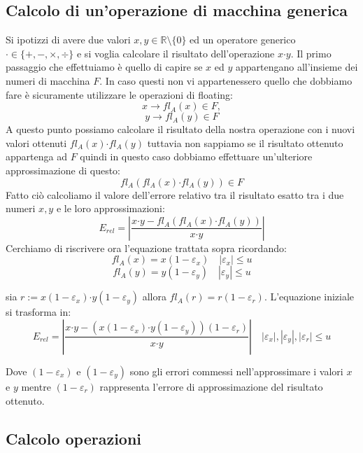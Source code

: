 \documentclass[12pt, a4paper]{book}
\theoremstyle{definition}
\begin{document}
\subsection{ Calcolo di un'operazione di macchina generica}
\begin{flushleft}
Si ipotizzi di avere due valori $x,y \in \mathbb{R} \setminus \{ 0 \}$ ed un operatore generico $\boldsymbol{\cdot} \in \{ + ,  -,  \times,  \div\}$ e si voglia calcolare il risultato dell'operazione $x \boldsymbol{\cdot}  y$.
Il primo passaggio che effettuiamo è quello di capire se $x$ ed $y$ appartengano all'insieme dei numeri di macchina $F$. 
In caso questi non vi appartenessero quello che dobbiamo fare è sicuramente utilizzare le operazioni di floating: 
\[ x \longrightarrow fl_{A}(x) \in F, \]
\[y \longrightarrow fl_{A}(y) \in F \]
A questo punto possiamo calcolare il risultato della nostra operazione con i nuovi valori ottenuti $fl_{A}(x) \boldsymbol{\cdot}  fl_{A}(y)$ tuttavia non sappiamo se il risultato ottenuto appartenga ad $F$ quindi in questo caso dobbiamo effettuare un'ulteriore approssimazione di questo: 
\[ 
	fl_{A}(fl_{A}(x) \boldsymbol{\cdot}  fl_{A}(y)) \in F 
\]
Fatto ciò calcoliamo il valore dell'errore relativo tra il risultato esatto tra i due numeri $x,y$ e le loro approssimazioni: 
 \[
 	E_{rel} =  \displaystyle\left\lvert \frac{x \boldsymbol{\cdot} y - fl_{A}(fl_{A}(x) \boldsymbol{\cdot}  fl_{A}(y)) }{x \boldsymbol{\cdot} y} \right\rvert
 \]
Cerchiamo di riscrivere ora l'equazione trattata sopra ricordando: 
\[ fl_{A}(x) = x(1 - \varepsilon_{x}) \quad |\varepsilon_{x}| \leq u \]
\[ fl_{A}(y) = y(1 - \varepsilon_{y}) \quad |\varepsilon_{y}| \leq u \]

sia $r:=  x(1 - \varepsilon_{x})\boldsymbol{\cdot}  y(1 - \varepsilon_{y}) $ allora $fl_{A}(r) = r(1-\varepsilon_{r})$.  L'equazione iniziale si trasforma in:
\[E_{rel} =  \displaystyle\left\lvert \frac{x \boldsymbol{\cdot} y - (x(1 - \varepsilon_{x})\boldsymbol{\cdot}  y(1 - \varepsilon_{y}))(1-\varepsilon_{r})}{x \boldsymbol{\cdot} y} \right\rvert \quad |\varepsilon_{x}|, |\varepsilon_{y}|, |\varepsilon_{r}| \leq u\]

Dove $(1-\varepsilon_{x})$ e $(1 - \varepsilon_{y})$ sono gli errori commessi nell'approssimare i valori $x$ e $y$ mentre $(1 - \varepsilon_{r})$ rappresenta l'errore di approssimazione del risultato ottenuto.
\end{flushleft}

\subsection{Calcolo operazioni}
\end{document}
